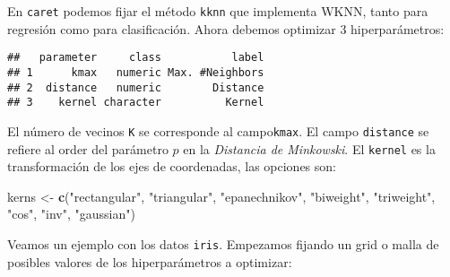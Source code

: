 \documentclass[]{book}
\newenvironment{Shaded}{\begin{snugshade}}{\end{snugshade}}
\newcommand{\KeywordTok}[1]{\textcolor[rgb]{0.13,0.29,0.53}{\textbf{#1}}}
\newcommand{\NormalTok}[1]{#1}
\newcommand{\OperatorTok}[1]{\textcolor[rgb]{0.81,0.36,0.00}{\textbf{#1}}}
\newcommand{\StringTok}[1]{\textcolor[rgb]{0.31,0.60,0.02}{#1}}
\begin{document}
En \texttt{caret} podemos fijar el método \texttt{kknn} que implementa WKNN, tanto para regresión como para clasificación. Ahora debemos optimizar 3 hiperparámetros:

\begin{Shaded}
\end{Shaded}

\begin{verbatim}
##   parameter     class           label
## 1      kmax   numeric Max. #Neighbors
## 2  distance   numeric        Distance
## 3    kernel character          Kernel
\end{verbatim}

El número de vecinos \texttt{K} se corresponde al campo\texttt{kmax}. El campo \texttt{distance} se refiere al order del parámetro \(p\) en la \emph{Distancia de Minkowski}. El \texttt{kernel} es la transformación de los ejes de coordenadas, las opciones son:

\begin{Shaded}
\begin{Highlighting}[]
\NormalTok{kerns <-}\StringTok{ }\KeywordTok{c}\NormalTok{(}\StringTok{"rectangular"}\NormalTok{, }\StringTok{"triangular"}\NormalTok{, }\StringTok{"epanechnikov"}\NormalTok{, }\StringTok{"biweight"}\NormalTok{, }\StringTok{"triweight"}\NormalTok{, }
                                 \StringTok{"cos"}\NormalTok{, }\StringTok{"inv"}\NormalTok{, }\StringTok{"gaussian"}\NormalTok{)}
\end{Highlighting}
\end{Shaded}

Veamos un ejemplo con los datos \texttt{iris}. Empezamos fijando un grid o malla de posibles valores de los hiperparámetros a optimizar:
\end{document}
